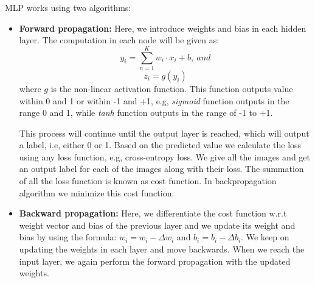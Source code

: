 \par MLP works using two algorithms:
\begin{itemize}
    \item \textbf{Forward propagation: }Here, we introduce weights and bias in each hidden layer. The computation in each node will be given as: 
    $$y_i=\sum_{n=1}^{K}w_i\cdot x_i+b,\ and$$
    $$z_i=g(y_i)$$
    where $g$ is the non-linear activation function. This function outputs value within 0 and 1 or within -1 and +1, e.g, \textit{sigmoid} function outputs in the range 0 and 1, while \textit{tanh} function outputs in the range of -1 to +1.
    \par This process will continue until the output layer is reached, which will output a label, i.e, either 0 or 1. Based on the predicted value we calculate the loss using any loss function, e.g, cross-entropy loss. We give all the images and get an output label for each of the images along with their loss. The summation of all the loss function is known as cost function. In backpropagation algorithm we minimize this cost function.
    \item \textbf{Backward propagation: }Here, we differentiate the cost function w.r.t weight vector and bias of the previous layer and we update its weight and bias by using the formula: $w_i=w_i-\Delta w_i$ and $b_i=b_i-\Delta b_i$. We keep on updating the weights in each layer and move backwards. When we reach the input layer, we again perform the forward propagation with the updated weights. 
\end{itemize}



